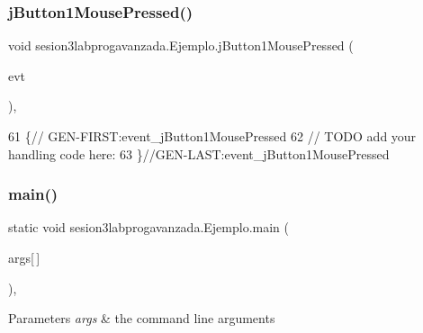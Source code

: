 \mbox{\label{classsesion3labprogavanzada_1_1_ejemplo_a2718c3cd0a04e4a09a5bb6a2252807ad}} 
\subsubsection{\texorpdfstring{j\+Button1\+Mouse\+Pressed()}{jButton1MousePressed()}}
{\footnotesize\ttfamily void sesion3labprogavanzada.\+Ejemplo.\+j\+Button1\+Mouse\+Pressed (\begin{DoxyParamCaption}\item[{java.\+awt.\+event.\+Mouse\+Event}]{evt }\end{DoxyParamCaption})\hspace{0.3cm}{\ttfamily [inline]}, {\ttfamily [private]}}


\begin{DoxyCode}
61                                                                      \{\textcolor{comment}{//
      GEN-FIRST:event\_jButton1MousePressed}
62         \textcolor{comment}{// TODO add your handling code here:}
63     \}\textcolor{comment}{//GEN-LAST:event\_jButton1MousePressed}
\end{DoxyCode}
\mbox{\label{classsesion3labprogavanzada_1_1_ejemplo_a8b28553a42993aa889c34812810e3b9d}} 
\subsubsection{\texorpdfstring{main()}{main()}}
{\footnotesize\ttfamily static void sesion3labprogavanzada.\+Ejemplo.\+main (\begin{DoxyParamCaption}\item[{String}]{args\mbox{[}$\,$\mbox{]} }\end{DoxyParamCaption})\hspace{0.3cm}{\ttfamily [inline]}, {\ttfamily [static]}}


\begin{DoxyParams}{Parameters}
{\em args} & the command line arguments \\
\hline
\end{DoxyParams}

